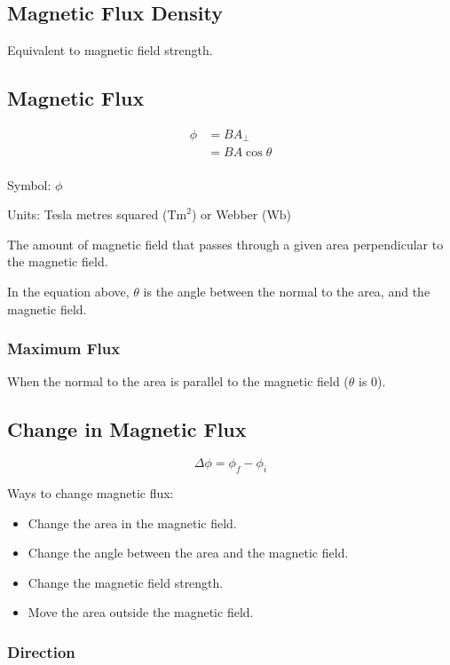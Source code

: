 \documentclass[a4paper,11pt]{article}
\begin{document}
\subsection{Magnetic Flux Density}

Equivalent to magnetic field strength.


\subsection{Magnetic Flux}

$$
\begin{aligned}
\phi & = BA_{\bot} \\
& = BA \cos{\theta} \\
\end{aligned}
$$

Symbol: $\phi$

Units: Tesla metres squared ($\text{Tm}^2$) or Webber ($\text{Wb}$)

The amount of magnetic field that passes through a given area perpendicular to
the magnetic field.

In the equation above, $\theta$ is the angle between the normal to the area,
and the magnetic field.


\subsubsection{Maximum Flux}

When the normal to the area is parallel to the magnetic field ($\theta$ is 0).


\subsection{Change in Magnetic Flux}

$$
\Delta \phi = \phi_f - \phi_i
$$

Ways to change magnetic flux:

\begin{itemize}
\item Change the area in the magnetic field.
\item Change the angle between the area and the magnetic field.
\item Change the magnetic field strength.
\item Move the area outside the magnetic field.
\end{itemize}


\subsubsection{Direction}
\end{document}
